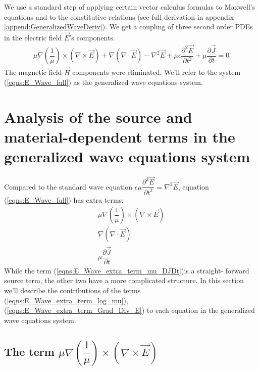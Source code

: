 \documentclass[12pt,twoside]{report}
\begin{document}
We use a standard step of applying certain vector calculus formulas to Maxwell's equations and to the constitutive relations (see full derivation in appendix \ref{append:GeneralizedWaveDeriv}). We get a coupling of three second order PDEs in the electric field $\overrightarrow{E}$'s components. 
\begin{align}
\label{eqns:E_Wave_full}
\mu \nabla \left( \dfrac{1}{\mu} \right) \times \left(\nabla \times \overrightarrow{E} \right) +  \nabla (\nabla \cdot \overrightarrow{E}) - \nabla^2 \overrightarrow{E} + \mu \epsilon\dfrac{\partial^2 \overrightarrow{E}}{\partial t^2} + \mu \dfrac{\partial \overrightarrow{J}}{\partial t} = 0
\end{align}
The magnetic field $\overrightarrow{H}$ components were eliminated. We'll refer to the system (\ref{eqns:E_Wave_full}) as the generalized wave equations system.





\section{Analysis of the source and material-dependent terms in the generalized wave equations system}

Compared to the standard wave equation $\epsilon \mu\dfrac{\partial ^2\overrightarrow{E}}{\partial t^2} =  \nabla^2 \overrightarrow{E}$, equation (\ref{eqns:E_Wave_full}) has extra terms:
\begin{subequations}
\begin{align}
\mu \nabla \left( \dfrac{1}{\mu} \right) \times \left(\nabla \times \overrightarrow{E} \right) \label{eqns:E_Wave_extra_term_log_mu}\\
\nabla (\nabla \cdot \overrightarrow{E}) \label{eqns:E_Wave_extra_term_Grad_Div_E} \\
\mu \dfrac{\partial \overrightarrow{J}}{\partial t} \label{eqns:E_Wave_extra_term_mu_DJDt} 
\end{align}
\end{subequations}
While the term (\ref{eqns:E_Wave_extra_term_mu_DJDt})is a straight- forward source term, the other two have a more complicated structure. In this section we'll describe the contributions of the terms (\ref{eqns:E_Wave_extra_term_log_mu}), (\ref{eqns:E_Wave_extra_term_Grad_Div_E}) to each equation in the generalized wave equations system.

\subsection{The term $\mu \nabla \left( \dfrac{1}{\mu} \right) \times \left(\nabla \times \vec{E} \right)$}
\end{document}
